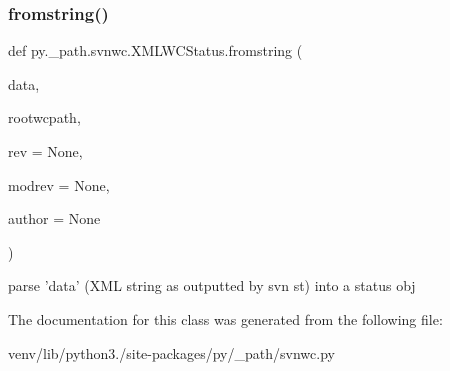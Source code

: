 \subsubsection{\texorpdfstring{fromstring()}{fromstring()}}
{\footnotesize\ttfamily def py.\+\_\+path.\+svnwc.\+X\+M\+L\+W\+C\+Status.\+fromstring (\begin{DoxyParamCaption}\item[{}]{data,  }\item[{}]{rootwcpath,  }\item[{}]{rev = {\ttfamily None},  }\item[{}]{modrev = {\ttfamily None},  }\item[{}]{author = {\ttfamily None} }\end{DoxyParamCaption})}

\begin{DoxyVerb}parse 'data' (XML string as outputted by svn st) into a status obj
\end{DoxyVerb}
 

The documentation for this class was generated from the following file\+:\begin{DoxyCompactItemize}
\item 
venv/lib/python3./site-\/packages/py/\+\_\+path/svnwc.\+py\end{DoxyCompactItemize}
